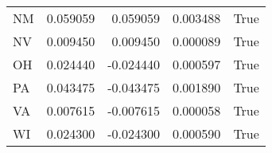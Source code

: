 \begin{table}
\begin{tabular}{lrrrl}
      NM &   0.059059 &  0.059059 &       0.003488 &          True \\
      NV &   0.009450 &  0.009450 &       0.000089 &          True \\
      OH &   0.024440 & -0.024440 &       0.000597 &          True \\
      PA &   0.043475 & -0.043475 &       0.001890 &          True \\
      VA &   0.007615 & -0.007615 &       0.000058 &          True \\
      WI &   0.024300 & -0.024300 &       0.000590 &          True \\
\bottomrule
\end{tabular}
\end{table}
